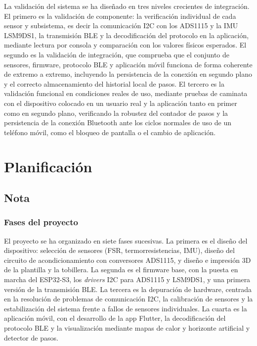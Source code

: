 \begin{IAtext}
La validación del sistema se ha diseñado en tres niveles crecientes de integración. El primero es la validación de componente: la verificación individual de cada sensor y subsistema, es decir la comunicación I2C con los ADS1115 y la IMU LSM9DS1, la transmisión BLE y la decodificación del protocolo en la aplicación, mediante lectura por consola y comparación con los valores físicos esperados. El segundo es la validación de integración, que comprueba que el conjunto de sensores, firmware, protocolo BLE y aplicación móvil funciona de forma coherente de extremo a extremo, incluyendo la persistencia de la conexión en segundo plano y el correcto almacenamiento del historial local de pasos. El tercero es la validación funcional en condiciones reales de uso, mediante pruebas de caminata con el dispositivo colocado en un usuario real y la aplicación tanto en primer como en segundo plano, verificando la robustez del contador de pasos y la persistencia de la conexión Bluetooth ante los ciclos normales de uso de un teléfono móvil, como el bloqueo de pantalla o el cambio de aplicación.

\section{Planificación}

\subsection*{Nota}

\subsubsection*{Fases del proyecto}

El proyecto se ha organizado en siete fases sucesivas. La primera es el diseño del dispositivo: selección de sensores (FSR, termorresistencias, IMU), diseño del circuito de acondicionamiento con conversores ADS1115, y diseño e impresión 3D de la plantilla y la tobillera. La segunda es el firmware base, con la puesta en marcha del ESP32-S3, los \textit{drivers} I2C para ADS1115 y LSM9DS1, y una primera versión de la transmisión BLE. La tercera es la depuración de hardware, centrada en la resolución de problemas de comunicación I2C, la calibración de sensores y la estabilización del sistema frente a fallos de sensores individuales. La cuarta es la aplicación móvil, con el desarrollo de la app Flutter, la decodificación del protocolo BLE y la visualización mediante mapas de calor y horizonte artificial y detector de pasos.


\end{IAtext}
